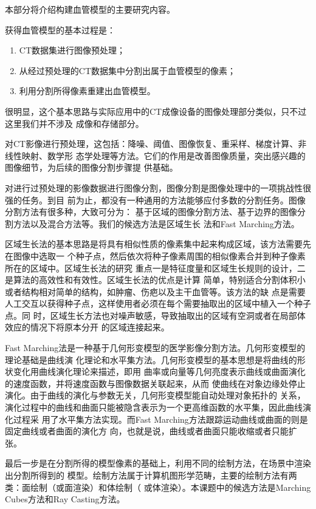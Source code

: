 本部分将介绍构建血管模型的主要研究内容。

获得血管模型的基本过程是\cite{Preim2008Review}：
\begin{enumerate}
  \item CT数据集进行图像预处理；
  \item 从经过预处理的CT数据集中分割出属于血管模型的像素；
  \item 利用分割所得像素重建出血管模型。
\end{enumerate}
很明显，这个基本思路与实际应用中的CT成像设备的图像处理部分类似，只不过这里我们并不涉及
成像和存储部分。

对CT影像进行预处理，这包括：降噪、阈值、图像恢复、重采样、梯度计算、非线性映射、数学形
态学处理等方法。它们的作用是改善图像质量，突出感兴趣的图像细节，为后续的图像分割步骤提
供基础。

对进行过预处理的影像数据进行图像分割，图像分割是图像处理中的一项挑战性很强的任务。到目
前为止，都没有一种通用的方法能够应付多数的分割任务。图像分割方法有很多种，大致可分为：
基于区域的图像分割方法、基于边界的图像分割方法以及混合方法等。我们的候选方法是区域生长
法和Fast Marching方法。

区域生长法的基本思路是将具有相似性质的像素集中起来构成区域，该方法需要先在图像中选取一
个种子点，然后依次将种子像素周围的相似像素合并到种子像素所在的区域中。区域生长法的研究
重点一是特征度量和区域生长规则的设计，二是算法的高效性和有效性。区域生长法的优点是计算
简单，特别适合分割体积小或者结构相对简单的结构，如肿瘤、伤疤以及主干血管等。该方法的缺
点是需要人工交互以获得种子点，这样使用者必须在每个需要抽取出的区域中植入一个种子点。同
时，区域生长方法也对噪声敏感，导致抽取出的区域有空洞或者在局部体效应的情况下将原本分开
的区域连接起来。

Fast Marching法是一种基于几何形变模型的医学影像分割方法。几何形变模型的理论基础是曲线演
化理论和水平集方法。几何形变模型的基本思想是将曲线的形状变化用曲线演化理论来描述，即用
曲率或向量等几何亮度表示曲线或曲面演化的速度函数，并将速度函数与图像数据关联起来，从而
使曲线在对象边缘处停止演化。由于曲线的演化与参数无关，几何形变模型能自动处理对象拓扑的
关系，演化过程中的曲线和曲面只能被隐含表示为一个更高维函数的水平集，因此曲线演化过程采
用了水平集方法实现。而Fast Marching方法跟踪运动曲线或曲面的则是固定曲线或者曲面的演化方
向，也就是说，曲线或者曲面只能收缩或者只能扩张。

最后一步是在分割所得的模型像素的基础上，利用不同的绘制方法，在场景中渲染出分割所得到的
模型。绘制方法属于计算机图形学范畴，主要的绘制方法有两类：面绘制（或面渲染）和体绘制（
或体渲染）。本课题中的候选方法是Marching Cubes方法和Ray Casting方法。

